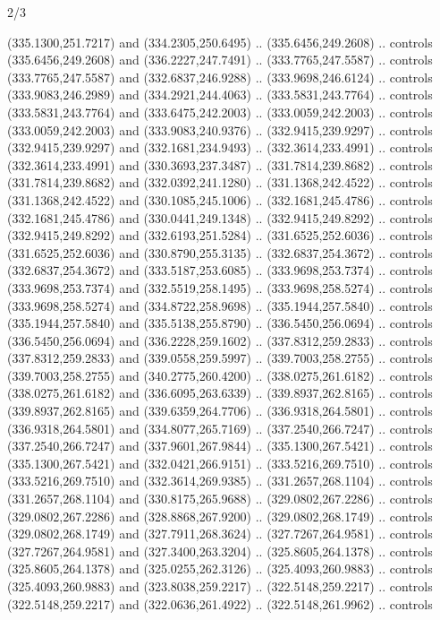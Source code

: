 \begin{flagdescription}{2/3}
\begin{scope}[xshift=0.5\flaglength,yshift=0.5\flagwidth,scale=\flagwidth/318.91]
\begin{scope}[y=0.8pt, x=0.8pt, yscale=-1,shift={(-298.97,-199.32)}]
  (335.1300,251.7217) and (334.2305,250.6495) .. (335.6456,249.2608) .. controls
  (335.6456,249.2608) and (336.2227,247.7491) .. (333.7765,247.5587) .. controls
  (333.7765,247.5587) and (332.6837,246.9288) .. (333.9698,246.6124) .. controls
  (333.9083,246.2989) and (334.2921,244.4063) .. (333.5831,243.7764) .. controls
  (333.5831,243.7764) and (333.6475,242.2003) .. (333.0059,242.2003) .. controls
  (333.0059,242.2003) and (333.9083,240.9376) .. (332.9415,239.9297) .. controls
  (332.9415,239.9297) and (332.1681,234.9493) .. (332.3614,233.4991) .. controls
  (332.3614,233.4991) and (330.3693,237.3487) .. (331.7814,239.8682) .. controls
  (331.7814,239.8682) and (332.0392,241.1280) .. (331.1368,242.4522) .. controls
  (331.1368,242.4522) and (330.1085,245.1006) .. (332.1681,245.4786) .. controls
  (332.1681,245.4786) and (330.0441,249.1348) .. (332.9415,249.8292) .. controls
  (332.9415,249.8292) and (332.6193,251.5284) .. (331.6525,252.6036) .. controls
  (331.6525,252.6036) and (330.8790,255.3135) .. (332.6837,254.3672) .. controls
  (332.6837,254.3672) and (333.5187,253.6085) .. (333.9698,253.7374) .. controls
  (333.9698,253.7374) and (332.5519,258.1495) .. (333.9698,258.5274) .. controls
  (333.9698,258.5274) and (334.8722,258.9698) .. (335.1944,257.5840) .. controls
  (335.1944,257.5840) and (335.5138,255.8790) .. (336.5450,256.0694) .. controls
  (336.5450,256.0694) and (336.2228,259.1602) .. (337.8312,259.2833) .. controls
  (337.8312,259.2833) and (339.0558,259.5997) .. (339.7003,258.2755) .. controls
  (339.7003,258.2755) and (340.2775,260.4200) .. (338.0275,261.6182) .. controls
  (338.0275,261.6182) and (336.6095,263.6339) .. (339.8937,262.8165) .. controls
  (339.8937,262.8165) and (339.6359,264.7706) .. (336.9318,264.5801) .. controls
  (336.9318,264.5801) and (334.8077,265.7169) .. (337.2540,266.7247) .. controls
  (337.2540,266.7247) and (337.9601,267.9844) .. (335.1300,267.5421) .. controls
  (335.1300,267.5421) and (332.0421,266.9151) .. (333.5216,269.7510) .. controls
  (333.5216,269.7510) and (332.3614,269.9385) .. (331.2657,268.1104) .. controls
  (331.2657,268.1104) and (330.8175,265.9688) .. (329.0802,267.2286) .. controls
  (329.0802,267.2286) and (328.8868,267.9200) .. (329.0802,268.1749) .. controls
  (329.0802,268.1749) and (327.7911,268.3624) .. (327.7267,264.9581) .. controls
  (327.7267,264.9581) and (327.3400,263.3204) .. (325.8605,264.1378) .. controls
  (325.8605,264.1378) and (325.0255,262.3126) .. (325.4093,260.9883) .. controls
  (325.4093,260.9883) and (323.8038,259.2217) .. (322.5148,259.2217) .. controls
  (322.5148,259.2217) and (322.0636,261.4922) .. (322.5148,261.9962) .. controls

\end{scope}
\end{scope}
\end{flagdescription}
